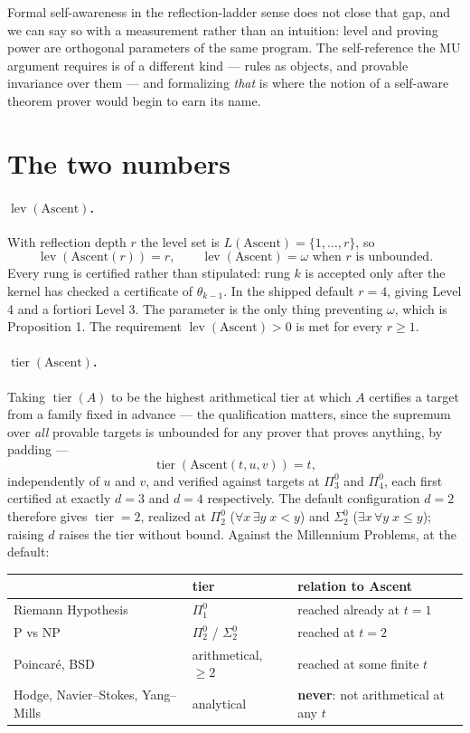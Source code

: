 \documentclass[11pt,a4paper]{article}
\newcommand{\Sig}[2]{\Sigma^{#1}_{#2}}
\newcommand{\Pai}[2]{\Pi^{#1}_{#2}}
\newcommand{\lev}{\operatorname{lev}}
\newcommand{\tier}{\operatorname{tier}}
\begin{document}
Formal self-awareness in the reflection-ladder sense does not close that gap,
and we can say so with a measurement rather than an intuition: level and
proving power are orthogonal parameters of the same program. The self-reference
the MU argument requires is of a different kind --- rules as objects, and
provable invariance over them --- and formalizing \emph{that} is where the
notion of a self-aware theorem prover would begin to earn its name.

\appendix

\section{The two numbers}

\paragraph{$\lev(\text{Ascent})$.} With reflection depth $r$ the level set is
$L(\text{Ascent}) = \{1,\dots,r\}$, so
\[
\lev(\text{Ascent}(r)) = r, \qquad
\lev(\text{Ascent}) = \omega \text{ when } r \text{ is unbounded.}
\]
Every rung is certified rather than stipulated: rung $k$ is accepted only after
the kernel has checked a certificate of $\theta_{k-1}$. In the shipped default
$r = 4$, giving Level 4 and a fortiori Level 3. The parameter is the only thing
preventing $\omega$, which is Proposition 1. The requirement
$\lev(\text{Ascent}) > 0$ is met for every $r \ge 1$.

\paragraph{$\tier(\text{Ascent})$.} Taking $\tier(A)$ to be the highest
arithmetical tier at which $A$ certifies a target from a family fixed in
advance --- the qualification matters, since the supremum over \emph{all}
provable targets is unbounded for any prover that proves anything, by padding
---
\[
\tier(\text{Ascent}(t,u,v)) = t,
\]
independently of $u$ and $v$, and verified against targets at $\Pai{0}{3}$ and
$\Pai{0}{4}$, each first certified at exactly $d = 3$ and $d = 4$
respectively. The default configuration $d = 2$ therefore gives
$\tier = 2$, realized at $\Pai{0}{2}$ ($\forall x\,\exists y\; x<y$) and
$\Sig{0}{2}$ ($\exists x\,\forall y\; x \le y$); raising $d$ raises the tier
without bound. Against the Millennium Problems, at the default:

\begin{center}
\begin{tabular}{@{}lll@{}}
\toprule
& tier & relation to Ascent \\
\midrule
Riemann Hypothesis & $\Pai{0}{1}$ & reached already at $t = 1$ \\
P vs NP & $\Pai{0}{2}$ / $\Sig{0}{2}$ & reached at $t = 2$ \\
Poincar\'e, BSD & arithmetical, $\ge 2$ & reached at some finite $t$ \\
Hodge, Navier--Stokes, Yang--Mills & analytical & \textbf{never}: not
arithmetical at any $t$ \\
\bottomrule
\end{tabular}
\end{center}
\end{document}
